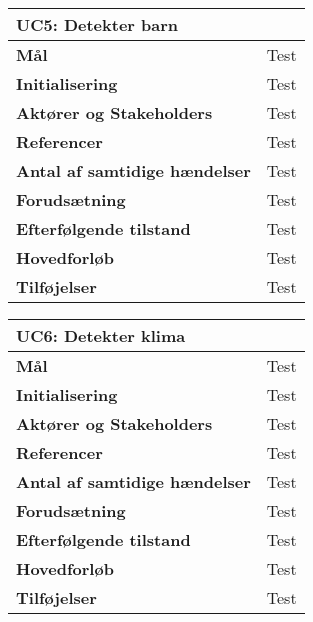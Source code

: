 \begin{table}[htbp] \centering
\begin{tabular}{|l|l|} %
	\hline
\multicolumn{2}{|l|}{\textbf{UC5: Detekter barn}} \\\hline
\textbf{Mål}								&Test \\\hline
\textbf{Initialisering}					&Test \\\hline
\textbf{Aktører og Stakeholders}			&Test \\\hline
\textbf{Referencer}						&Test \\\hline
\textbf{Antal af samtidige hændelser}	&Test \\\hline
\textbf{Forudsætning}					&Test \\\hline
\textbf{Efterfølgende tilstand}			&Test \\\hline
\textbf{Hovedforløb}						&Test \\\hline
\textbf{Tilføjelser}						&Test \\\hline
	\end{tabular}
	\label{UC5} 
\end{table}

\begin{table}[htbp] \centering
\begin{tabular}{|l|l|} %
	\hline
\multicolumn{2}{|l|}{\textbf{UC6: Detekter klima}} \\\hline
\textbf{Mål}								&Test \\\hline
\textbf{Initialisering}					&Test \\\hline
\textbf{Aktører og Stakeholders}			&Test \\\hline
\textbf{Referencer}						&Test \\\hline
\textbf{Antal af samtidige hændelser}	&Test \\\hline
\textbf{Forudsætning}					&Test \\\hline
\textbf{Efterfølgende tilstand}			&Test \\\hline
\textbf{Hovedforløb}						&Test \\\hline
\textbf{Tilføjelser}						&Test \\\hline
	\end{tabular}
	\label{UC6} 
\end{table}

